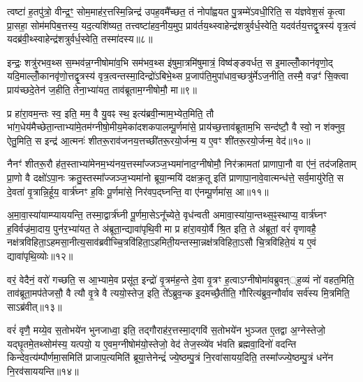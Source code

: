 त्वष्टा॑ ह॒तपु॑त्रो॒ वीन्द्र॒ꣳ॒ सोम॒माह॑र॒त्तस्मि॒न्निन्द्र॑ उपह॒वमै᳚च्छत॒ तं नोपा᳚ह्वयत पु॒त्रम्मे॑\-ऽवधी॒रिति॒ स य॑ज्ञवेश॒सं कृ॒त्वा प्रा॒सहा॒ सोम॑मपिब॒त्तस्य॒ यद॒त्यशि॑ष्यत॒ तत्त्वष्टा॑हव॒नीय॒मुप॒ प्राव॑र्तय॒थ्स्वाहेन्द्र॑शत्रुर्वर्ध॒स्वेति॒ यदव॑र्तय॒त्तद्वृ॒त्रस्य॑ वृत्र॒त्वं यदब्र॑वी॒थ्स्वाहेन्द्र॑शत्रुर्वर्ध॒स्वेति॒ तस्मा॑दस्य॥८॥

इन्द्रः॒ शत्रु॑रभव॒थ्स स॒म्भव॑न्न॒ग्नीषोमा॑व॒भि सम॑भव॒थ्स इ॑षुमा॒त्रमि॑षुमात्रं॒ विष्व॑ङ्ङवर्धत॒ स इ॒माल्लोँ॒कान॑वृणो॒द् यदि॒माल्लोँ॒कानवृ॑णो॒त्तद्वृ॒त्रस्य॑ वृत्र॒त्वन्तस्मा॒दिन्द्रो॑\-ऽबिभे॒थ्स प्र॒जाप॑ति॒मुपा॑धाव॒च्छत्रु॑र्मे\-ऽज॒नीति॒ तस्मै॒ वज्रꣳ॑ सि॒क्त्वा प्राय॑च्छदे॒तेन॑ ज॒हीति॒ तेना॒भ्या॑यत॒ ताव॑ब्रूताम॒ग्नीषोमौ॒ मा॥९॥

प्र हा॑रा॒वम॒न्तः स्व॒ इति॒ मम॒ वै यु॒वꣴ स्थ॒ इत्य॑ब्रवी॒न्माम॒भ्येत॒मिति॒ तौ भा॑ग॒धेय॑मैच्छेता॒न्ताभ्या॑मे॒तम॑ग्नीषो॒मीय॒\-मेका॑दशकपालम्पू॒र्णमा॑से॒ प्राय॑च्छ॒त्ताव॑ब्रूताम॒भि सन्द॑ष्टौ॒ वै स्वो॒ न श॑क्नुव॒ ऐतु॒मिति॒ स इन्द्र॑ आ॒त्मनः॑ शीतरू॒राव॑जनय॒त्तच्छी॑तरू॒रयो॒र्जन्म॒ य ए॒वꣳ शी॑तरू॒रयो॒र्जन्म॒ वेद॑॥१०॥


नैनꣳ॑ शीतरू॒रौ ह॑त॒स्ताभ्या॑मेनम॒भ्य॑नय॒त्तस्मा᳚ज्जञ्ज॒भ्यमा॑नाद॒ग्नीषोमौ॒ निर॑क्रामतां प्राणापा॒नौ वा ए॑नं॒ तद॑जहिताम् प्रा॒णो वै दक्षो॑\-ऽपा॒नः क्रतु॒स्तस्मा᳚ज्जञ्ज॒भ्यमा॑नो ब्रूया॒न्मयि॑ दक्षक्र॒तू इति॑ प्राणापा॒नावे॒वात्मन्ध॑त्ते॒ सर्व॒मायु॑रेति॒ स दे॒वता॑ वृ॒त्रान्नि॒र्\mbox{}हूय॒ वार्त्र॑घ्नꣳ ह॒विः पू॒र्णमा॑से॒ निर॑वप॒द्घ्नन्ति॒ वा ए॑नम्पू॒र्णमा॑स॒ आ॥११॥

अ॒मा॒वा॒स्या॑याम्प्याययन्ति॒ तस्मा॒द्वार्त्र॑घ्नी पू॒र्णमा॒से\-ऽनू᳚च्येते॒ वृध॑न्वती अमावा॒स्या॑या॒न्तथ्स॒ꣴ॒स्थाप्य॒ वार्त्र॑घ्नꣳ ह॒विर्वज्र॑मा॒दाय॒ पुन॑र॒भ्या॑यत॒ ते अ॑ब्रूता॒न्द्यावा॑पृथि॒वी मा प्र हा॑रा॒वयो॒र्वै श्रि॒त इति॒ ते अ॑ब्रूतां॒ वरं॑ वृणावहै॒ नक्ष॑त्रविहिता॒\-ऽहमसा॒नीत्य॒साव॑ब्रवीच्चि॒त्रवि॑हिता॒\-ऽहमिती॒यन्तस्मा॒न्नक्ष॑त्रविहिता॒\-ऽसौ चि॒त्रवि॑हिते॒यं य ए॒वं द्यावा॑पृथि॒व्योः॥१२॥

वरं॒ वेदैनं॒ वरो॑ गच्छति॒ स आ॒भ्यामे॒व प्रसू॑त॒ इन्द्रो॑ वृ॒त्रम॑ह॒न्ते दे॒वा वृ॒त्रꣳ ह॒त्वा\-ऽग्नीषोमा॑वब्रुवऩ््ह॒व्यं नो॑ वहत॒मिति॒ ताव॑ब्रूता॒मप॑तेजसौ॒ वै त्यौ वृ॒त्रे वै त्ययो॒स्तेज॒ इति॒ ते᳚\-ऽब्रुव॒न्क इ॒दमच्छै॒तीति॒ गौरित्य॑ब्रुव॒न्गौर्वाव सर्व॑स्य मि॒त्रमिति॒ सा\-ऽब्र॑वीत्॥१३॥

वरं॑ वृणै॒ मय्ये॒व स॒तोभये॑न भुनजाध्वा॒ इति॒ तद्गौराह॑र॒त्तस्मा॒द्गवि॑ स॒तोभये॑न भुञ्जत ए॒तद्वा अ॒ग्नेस्तेजो॒ यद्घृ॒तमे॒तथ्सोम॑स्य॒ यत्पयो॒ य ए॒वम॒ग्नीषोम॑यो॒स्तेजो॒ वेद॑ तेज॒स्व्ये॑व भ॑वति ब्रह्मवा॒दिनो॑ वदन्ति किन्देव॒त्य॑म्पौर्णमा॒समिति॑ प्राजाप॒त्यमिति॑ ब्रूया॒त्तेनेन्द्रं॑ ज्ये॒ष्ठम्पु॒त्रं नि॒रवा॑सायय॒दिति॒ तस्मा᳚ज्ज्ये॒ष्ठम्पु॒त्रं धने॑न नि॒रव॑साययन्ति॥१४॥

